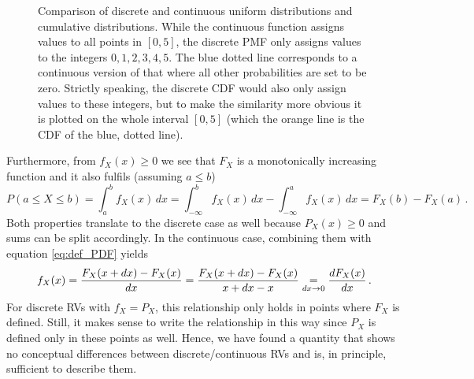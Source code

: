 \begin{figure}
\centering

%
\hspace{0.04\textwidth}%
%

\caption{Comparison of discrete and continuous uniform distributions and cumulative distributions. While the continuous function assigns values to all points in $[0, 5]$, the discrete PMF only assigns values to the integers $0, 1, 2, 3, 4, 5$. The blue dotted line corresponds to a continuous version of that where all other probabilities are set to be zero. Strictly speaking, the discrete CDF would also only assign values to these integers, but to make the similarity more obvious it is plotted on the whole interval $[0, 5]$ (which the orange line is the CDF of the blue, dotted line).}
\label{fig:CDF_comparison}
\end{figure}



Furthermore, from $f_X(x) \geq 0$ we see that $F_X$ is a monotonically increasing function and it also fulfils (assuming $a \leq b$)
\begin{equation}
P(a \leq X \leq b) = \int_a^b f_X(x) \, dx = \int_{-\infty}^b f_X(x) \, dx - \int_{-\infty}^a f_X(x) \, dx = F_X(b) - F_X(a) \, .
\end{equation}
Both properties translate to the discrete case as well because $P_X(x) \geq 0$ and sums can be split accordingly. In the continuous case, combining them with equation \eqref{eq:def_PDF} yields
\begin{equation}
f_X(x) = \frac{F_X(x + dx) - F_X(x)}{dx} = \frac{F_X(x + dx) - F_X(x)}{x + dx - x} \underset{dx \rightarrow 0}{=} \dv{F_X(x)}{x} \, .
\end{equation}
For discrete RVs with $f_X = P_X$, this relationship only holds in points where $F_X$ is defined. Still, it makes sense to write the relationship in this way since $P_X$ is defined only in these points as well. Hence, we have found a quantity that shows no conceptual differences between discrete/continuous RVs and is, in principle, sufficient to describe them.\\


